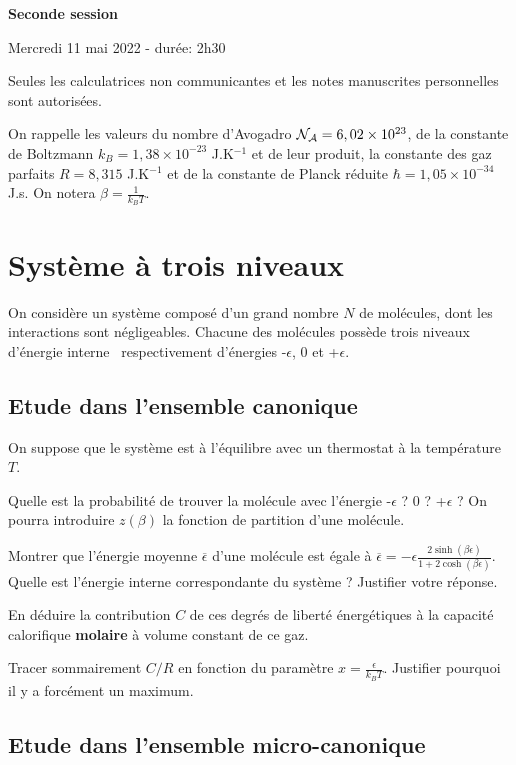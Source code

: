 \documentclass[utf8, 11pt]{feuille}
\begin{document}
\begin{center}
    \Large {\bf Seconde session}
    
    Mercredi 11 mai 2022 - durée: 2h30
\end{center}

Seules les calculatrices non communicantes et les notes manuscrites personnelles sont autorisées.

On rappelle les valeurs du nombre d'Avogadro ${\cal N_A}=6,02 \times 10^{23}$, de la constante de Boltzmann $k_B=1,38 \times 10^{-23}$ J.K$^{-1}$ et de leur produit, la constante des gaz parfaits $R=8,315$ J.K$^{-1}$ et de la constante de Planck réduite $\hbar = 1,05 \times 10^{-34}$ J.s. On notera  $\beta=\frac{1}{k_B T}$. 

\section{Système à trois niveaux}

On considère un système composé d'un grand nombre $N$ de molécules, dont les interactions sont négligeables. Chacune des molécules possède trois niveaux d'énergie \og interne \fg \, respectivement d'énergies -$\epsilon$, 0 et  +$\epsilon$. 


\subsection{Etude dans l'ensemble canonique}

 On suppose que le système est à l'équilibre avec un thermostat à la température $T$.
 
\question
Quelle est la probabilité de trouver la molécule avec l'énergie -$\epsilon$ ? 0 ? +$\epsilon$ ? On pourra introduire $z(\beta)$ la fonction de partition d'une molécule.

\question
Montrer que l'énergie  moyenne $\overline{\epsilon}$ d'une molécule est égale à $\overline{\epsilon}=- \epsilon \frac{2 \sinh (\beta \epsilon)}{1+2\cosh (\beta \epsilon)}$. Quelle est l'énergie interne correspondante du système  ? Justifier votre réponse.

\question
En déduire la contribution $C$ de ces degrés de liberté énergétiques à la capacité calorifique \textbf{molaire} à volume constant de ce gaz.

\question
Tracer sommairement $C/R$ en fonction du paramètre $x=\frac{\epsilon}{k_BT}$. Justifier pourquoi il y a forcément un maximum.

\subsection{Etude dans l'ensemble micro-canonique}
\end{document}
